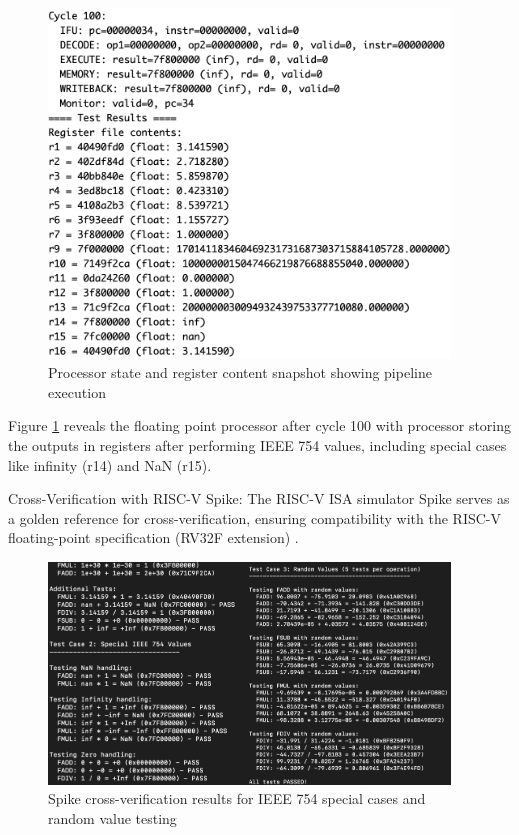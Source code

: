 \begin{figure}[htbp]
    \centering
    \includegraphics[width=0.95\textwidth]{figures/waveform5.png}
    \caption{Processor state and register content snapshot showing pipeline execution}
    \label{fig:console_output1}
\end{figure}

Figure \ref{fig:console_output1} reveals the floating point processor after cycle 100 with processor storing the outputs in registers after performing IEEE 754 values, including special cases like infinity (r14) and NaN (r15).

\vspace{0.3cm}
\noindent Cross-Verification with RISC-V Spike: The RISC-V ISA simulator Spike serves as a golden reference for cross-verification, ensuring compatibility with the RISC-V floating-point specification (RV32F extension) \cite{ref17}.

\begin{figure}[htbp]
    \centering
    \includegraphics[width=0.95\textwidth]{figures/waveform7.png}
    \caption{Spike cross-verification results for IEEE 754 special cases and random value testing}
    \label{fig:spike_tests}
\end{figure}

